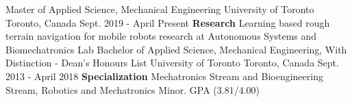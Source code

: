 \begin{cventries}
  \cventry
    {Master of Applied Science, Mechanical Engineering}
    {University of Toronto}
    {Toronto, Canada}
    {Sept. 2019 - April Present}
    {\textbf{Research} Learning based rough terrain navigation for mobile robots research at Autonomous Systems and Biomechatronics Lab}
  \cventry
    {Bachelor of Applied Science, Mechanical Engineering, With Distinction - Dean's Honours List}
    {University of Toronto}
    {Toronto, Canada}
    {Sept. 2013 - April 2018}
    {\textbf{Specialization} Mechatronics Stream and Bioengineering Stream, Robotics and Mechatronics Minor. GPA (3.81/4.00)}
\end{cventries}
